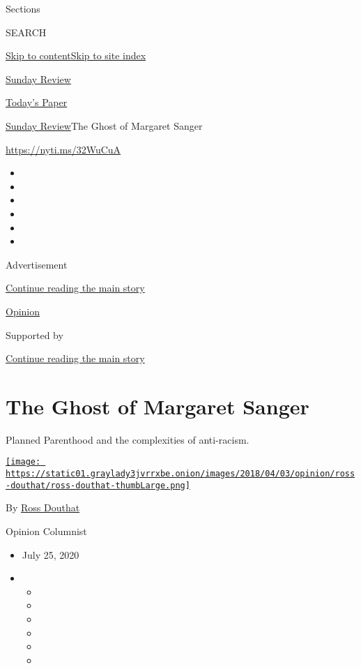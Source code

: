 Sections

SEARCH

\protect\hyperlink{site-content}{Skip to
content}\protect\hyperlink{site-index}{Skip to site index}

\href{https://www.nytimes3xbfgragh.onion/section/opinion/sunday}{Sunday
Review}

\href{https://myaccount.nytimes3xbfgragh.onion/auth/login?response_type=cookie\&client_id=vi}{}

\href{https://www.nytimes3xbfgragh.onion/section/todayspaper}{Today's
Paper}

\href{/section/opinion/sunday}{Sunday Review}\textbar{}The Ghost of
Margaret Sanger

\url{https://nyti.ms/32WuCuA}

\begin{itemize}
\item
\item
\item
\item
\item
\item
\end{itemize}

Advertisement

\protect\hyperlink{after-top}{Continue reading the main story}

\href{/section/opinion}{Opinion}

Supported by

\protect\hyperlink{after-sponsor}{Continue reading the main story}

\hypertarget{the-ghost-of-margaret-sanger}{%
\section{The Ghost of Margaret
Sanger}\label{the-ghost-of-margaret-sanger}}

Planned Parenthood and the complexities of anti-racism.

\href{https://www.nytimes3xbfgragh.onion/by/ross-douthat}{\texttt{[image: https://static01.graylady3jvrrxbe.onion/images/2018/04/03/opinion/ross-douthat/ross-douthat-thumbLarge.png]}}

By \href{https://www.nytimes3xbfgragh.onion/by/ross-douthat}{Ross
Douthat}

Opinion Columnist

\begin{itemize}
\item
  July 25, 2020
\item
  \begin{itemize}
  \item
  \item
  \item
  \item
  \item
  \item
  \end{itemize}
\end{itemize}

